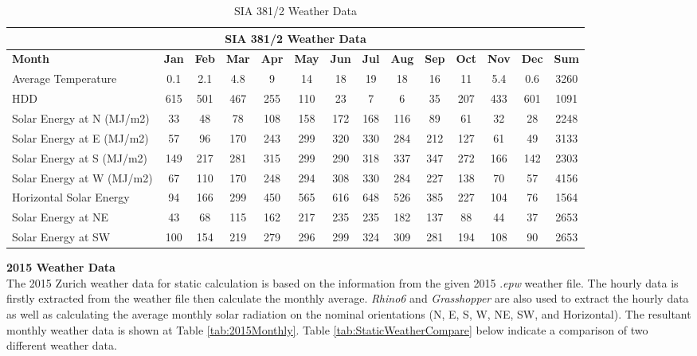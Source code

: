 \documentclass[11pt, a4paper]{article}
\theoremstyle{definition}
\begin{document}
				\begin{table}[H]
				  \centering
				  \small
				\caption{SIA 381/2 Weather Data}
				    \begin{tabular}{|p{5.355em}|c|c|c|c|c|c|c|c|c|c|c|c|c|}
				    \toprule
				    \multicolumn{14}{|c|}{SIA 381/2 Weather Data} \\
				    \midrule
				    \textbf{Month} & \textbf{Jan} & \textbf{Feb} & \textbf{Mar} & \textbf{Apr} & \textbf{May} & \textbf{Jun} & \textbf{Jul} & \textbf{Aug} & \textbf{Sep} & \textbf{Oct} & \textbf{Nov} & \textbf{Dec} & \textbf{Sum} \\
				    \midrule
				    Average Temperature & 0.1  & 2.1  & 4.8  & 9    & 14   & 18   & 19   & 18   & 16   & 11   & 5.4  & 0.6  & 3260 \\
				    \midrule
				    HDD  & 615  & 501  & 467  & 255  & 110  & 23   & 7    & 6    & 35   & 207  & 433  & 601  & 1091 \\
				    \midrule
				    Solar Energy at N (MJ/m2) & 33   & 48   & 78   & 108  & 158  & 172  & 168  & 116  & 89   & 61   & 32   & 28   & 2248 \\
				    \midrule
				    Solar Energy at E (MJ/m2) & 57   & 96   & 170  & 243  & 299  & 320  & 330  & 284  & 212  & 127  & 61   & 49   & 3133 \\
				    \midrule
				    Solar Energy at S (MJ/m2) & 149  & 217  & 281  & 315  & 299  & 290  & 318  & 337  & 347  & 272  & 166  & 142  & 2303 \\
				    \midrule
				    Solar Energy at W (MJ/m2) & 67   & 110  & 170  & 248  & 294  & 308  & 330  & 284  & 227  & 138  & 70   & 57   & 4156 \\
				    \midrule
				    Horizontal Solar Energy & 94   & 166  & 299  & 450  & 565  & 616  & 648  & 526  & 385  & 227  & 104  & 76   & 1564 \\
				    \midrule
				    Solar Energy at NE & 43   & 68   & 115  & 162  & 217  & 235  & 235  & 182  & 137  & 88   & 44   & 37   & 2653 \\
				    \midrule
				    Solar Energy at SW & 100  & 154  & 219  & 279  & 296  & 299  & 324  & 309  & 281  & 194  & 108  & 90   & 2653 \\
				    \bottomrule
				    \end{tabular}%
				  \label{tab:WeatherSIA3812}%
				\end{table}%



			\textbf{2015 Weather Data}\\
				The 2015 Zurich weather data for static calculation is based on the information from the given 2015 .\textit{epw} weather file. The hourly data is firstly extracted from the weather file then calculate the monthly average. \textit{Rhino6} and \textit{Grasshopper} are also used to extract the hourly data as well as calculating the average monthly solar radiation on the nominal orientations (N, E, S, W, NE, SW, and Horizontal). The resultant monthly weather data is shown at Table \ref{tab:2015Monthly}. Table \ref{tab:StaticWeatherCompare} below indicate a comparison of two different weather data.
				
\end{document}
